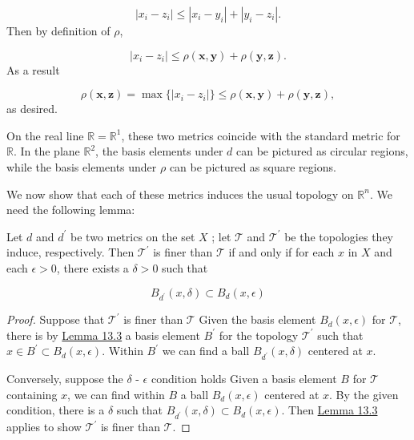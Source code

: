 \[
| {x_{i} - z_{i}}| \leq | {x_{i} - y_{i}}| + | {y_{i} - z_{i}}| .
\]
Then by definition of \(\rho\),

\[
| {x_{i} - z_{i}}| \leq \rho ( {\mathbf{x},\mathbf{y}}) + \rho ( {\mathbf{y},\mathbf{z}}).
\]
As a result

\[
\rho ( {\mathbf{x},\mathbf{z}}) = \max \{ | {x_{i} - z_{i}}| \} \leq \rho ( {\mathbf{x},\mathbf{y}}) + \rho ( {\mathbf{y},\mathbf{z}}),
\]
as desired.

On the real line \(\mathbb{R} = \mathbb{R}^{1}\), these two metrics coincide with the standard metric for \(\mathbb{R}\). In the plane \(\mathbb{R}^{2}\), the basis elements under \(d\) can be pictured as circular regions, while the basis elements under \(\rho\) can be pictured as square regions.

We now show that each of these metrics induces the usual topology on \(\mathbb{R}^{n}\). We need the following lemma:

\begin{lemma}
\label{lem:\thetheorem}
 Let \(d\) and \(d^{\prime }\) be two metrics on the set \(X\) ; let \(\mathcal{T}\) and \(\mathcal{T}^{\prime }\) be the topologies they induce, respectively. Then \(\mathcal{T}^{\prime }\) is finer than \(\mathcal{T}\) if and only if for each \(x\) in \(X\) and each \(\epsilon > 0\), there exists a \(\delta > 0\) such that

 \[
 B_{d^{\prime }}( {x,\delta }) \subset {B}_{d}( {x,\epsilon })
 \]
\end{lemma}

\begin{proof}
 Suppose that \(\mathcal{T}^{\prime }\) is finer than \(\mathcal{T}\) Given the basis element \(B_{d}( {x,\epsilon })\) for \(\mathcal{T}\), there is by \hyperref[lem:13.3]{Lemma 13.3} a basis element \(B^{\prime }\) for the topology \(\mathcal{T}^{\prime }\) such that \(x \in {B}^{\prime } \subset {B}_{d}( {x,\epsilon })\). Within \(B^{\prime }\) we can find a ball \(B_{d^{\prime }}( {x,\delta })\) centered at \(x\).

 Conversely, suppose the \(\delta\) - \(\epsilon\) condition holds Given a basis element \(B\) for \(\mathcal{T}\) containing \(x\), we can find within \(B\) a ball \(B_{d}( {x,\epsilon })\) centered at \(x\). By the given condition, there is a \(\delta\) such that \(B_{d^{\prime }}( {x,\delta }) \subset {B}_{d}( {x,\epsilon })\). Then \hyperref[lem:13.3]{Lemma 13.3} applies to show \(\mathcal{T}^{\prime }\) is finer than \(\mathcal{T}\).
\end{proof}

